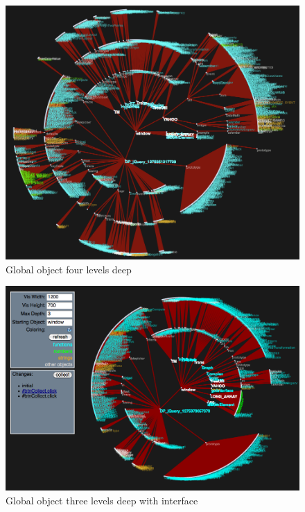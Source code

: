 \documentclass[]{article}
\begin{document}
\begin{figure}[h]
  \begin{center}
    \includegraphics[scale=.2]{deep-window.png}
  \end{center}
  \caption{Global object four levels deep}
  \label{fig:deep-window}
\end{figure}

\begin{figure}[h]
  \begin{center}
    \includegraphics[scale=.2]{interface.png}
  \end{center}
  \caption{Global object three levels deep with interface}
  \label{fig:interface}
\end{figure}
\end{document}
